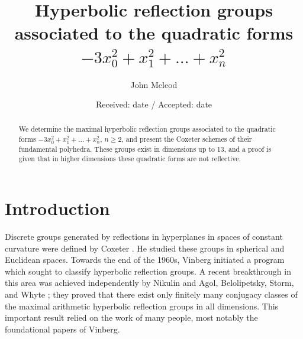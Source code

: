 \documentclass[smallcondensed]{svjour3}                     %
\begin{document}
\title{Hyperbolic reflection groups associated to the quadratic forms $-3x_0^2 + x_1^2 + \ldots + x_n^2$}


\author{John Mcleod}



\date{Received: date / Accepted: date}


\maketitle

\begin{abstract}
We determine the maximal hyperbolic reflection groups associated to the quadratic forms $-3x_0^2 + x_1^2 + \ldots + x_n^2$, $n \ge 2$, and present the Coxeter schemes of their fundamental polyhedra. These groups exist in dimensions up to 13, and a proof is given that in higher dimensions these quadratic forms are not reflective.
\end{abstract}

\section{Introduction}
\label{intro}
Discrete groups generated by reflections in hyperplanes in spaces of constant curvature were defined by Coxeter \cite{coxeter34}. He studied these groups in spherical and Euclidean spaces. Towards the end of the 1960s, Vinberg initiated a program which sought to classify hyperbolic reflection groups. A recent breakthrough in this area was achieved independently by Nikulin \cite{nikulin07} and Agol, Belolipetsky, Storm, and Whyte \cite{agolbelolipetskystormwhyte08}; they proved that there exist only finitely many conjugacy classes of the maximal arithmetic hyperbolic reflection groups in all dimensions. This important result relied on the work of many people, most notably the foundational papers of Vinberg.
\end{document}
